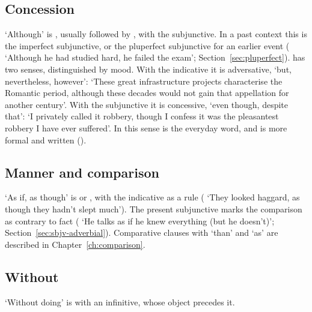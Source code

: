 \subsection{Concession}
`Although' is , usually followed by , with the subjunctive. In a past context this is the imperfect subjunctive, or the pluperfect subjunctive for an earlier event ( `Although he had studied hard, he failed the exam'; Section~\ref{sec:pluperfect}).
 has two senses, distinguished by mood. With the indicative it is adversative, `but, nevertheless, however':  `These great infrastructure projects characterise the Romantic period, although these decades would not gain that appellation for another century'. With the subjunctive it is concessive, `even though, despite that':  `I privately called it robbery, though I confess it was the pleasantest robbery I have ever suffered'. In this sense  is the everyday word, and  is more formal and written ().

\subsection{Manner and comparison}
`As if, as though' is  or , with the indicative as a rule ( `They looked haggard, as though they hadn't slept much'). The present subjunctive marks the comparison as contrary to fact ( `He talks as if he knew everything (but he doesn't)'; Section~\ref{sec:sbjv-adverbial}). Comparative clauses with  `than' and  `as' are described in Chapter~\ref{ch:comparison}.

\subsection{Without}
`Without doing' is  with an infinitive, whose object precedes it.

